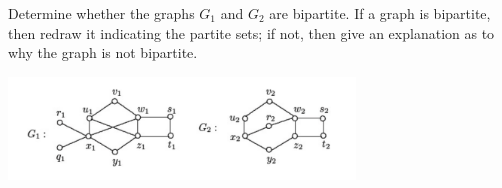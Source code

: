 \question Determine whether the graphs \(G_1\) and \(G_2\)
are bipartite. If a graph is bipartite, then redraw it
indicating the partite sets; if not, then give an 
explanation as to why the graph is not bipartite.

\begin{center}
  \includegraphics[width=0.69\textwidth]{figures/p1-graphs}
\end{center}

\begin{solution}
  
\end{solution}
